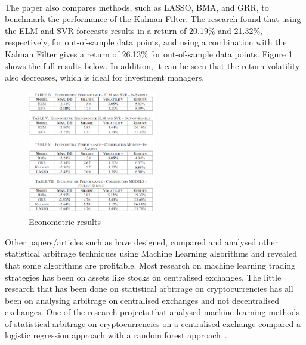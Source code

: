 \\[3mm]
\noindent The paper also compares methods, such as LASSO, BMA, and GRR, to benchmark the performance of the Kalman Filter. The research found that using the ELM and SVR forecasts results in a return of 20.19\% and 21.32\%, respectively, for out-of-sample data points, and using a combination with the Kalman Filter gives a return of 26.13\% for out-of-sample data points. Figure \ref{fig:kalman_ml_results} shows the full results below. In addition, it can be seen that the return volatility also decreases, which is ideal for investment managers.
\\[3mm]
\begin{figure}[htb!]
    \centering
    \includegraphics[width=0.5\textwidth]{background/Images/kalman_ml_results.png}
    \caption{Econometric results~\cite{6974093}}
    \label{fig:kalman_ml_results}
\end{figure}

\noindent Other papers/articles such as \cite{KRAUSS2017689, alma991000475380901591, jrfm12010031} have designed, compared and analysed other statistical arbitrage techniques using Machine Learning algorithms and revealed that some algorithms are profitable. Most research on machine learning trading strategies has been on assets like stocks on centralised exchanges. The little research that has been done on statistical arbitrage on cryptocurrencies has all been on analysing arbitrage on centralised exchanges and not decentralised exchanges. One of the research projects that analysed machine learning methods of statistical arbitrage on cryptocurrencies on a centralised exchange compared a logistic regression approach with a random forest approach~\cite{jrfm12010031}. 


